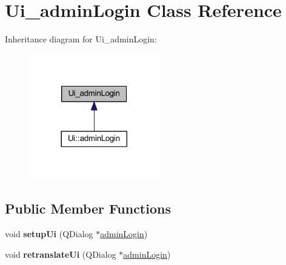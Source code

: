 \hypertarget{class_ui__admin_login}{}\section{Ui\+\_\+admin\+Login Class Reference}
\label{class_ui__admin_login}


Inheritance diagram for Ui\+\_\+admin\+Login\+:
\nopagebreak
\begin{figure}[H]
\begin{center}
\leavevmode
\includegraphics[width=161pt]{class_ui__admin_login__inherit__graph}
\end{center}
\end{figure}
\subsection*{Public Member Functions}
\begin{DoxyCompactItemize}
\item 
\mbox{\label{class_ui__admin_login_aa8777c76c85e8a71d5e2641651eda434}} 
void {\bfseries setup\+Ui} (Q\+Dialog $\ast$\mbox{\hyperlink{classadmin_login}{admin\+Login}})
\item 
\mbox{\label{class_ui__admin_login_a2a9d242468a1107cbc7b0d89b919dd2e}} 
void {\bfseries retranslate\+Ui} (Q\+Dialog $\ast$\mbox{\hyperlink{classadmin_login}{admin\+Login}})
\end{DoxyCompactItemize}
